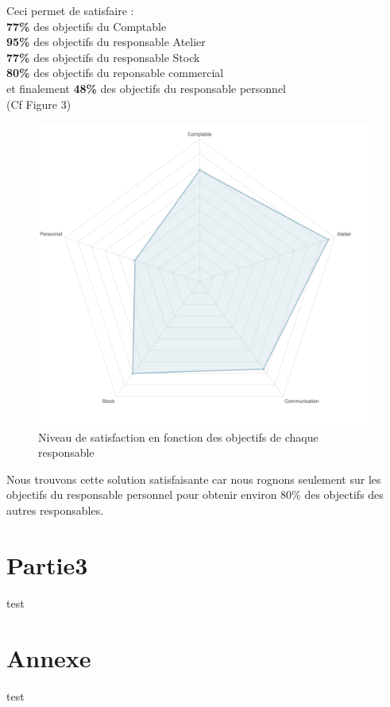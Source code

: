 \documentclass[a4paper, 11pt]{article}
\begin{document}
Ceci permet de satisfaire : \\
\textbf{77\%} des objectifs du Comptable\\
\textbf{95\%} des objectifs du responsable Atelier\\
\textbf{77\%} des objectifs du responsable Stock\\
\textbf{80\%} des objectifs du reponsable commercial\\
et finalement \textbf{48\%} des objectifs du responsable personnel\\
(Cf Figure 3)
\begin{figure}[H]
    \begin{center}
        \includegraphics[scale=0.38]{../Partie2/Partie2.png}
        \caption{
            \label{fig} Niveau de satisfaction en fonction des objectifs de chaque responsable
        }
    \end{center}
\end{figure}
Nous trouvons cette solution satisfaisante car nous rognons seulement sur les objectifs du responsable personnel pour obtenir environ 80\% des objectifs des autres responsables. 
\section{Partie3}
test

\section*{Annexe}
test
\end{document}
